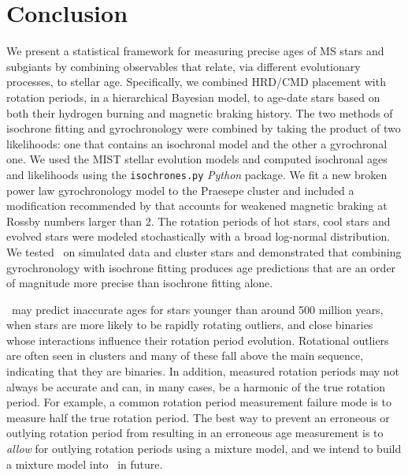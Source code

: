 \section{Conclusion}
\label{section:conclusion}

We present a statistical framework for measuring precise ages of MS stars and
subgiants by combining observables that relate, via different evolutionary
processes, to stellar age.
Specifically, we combined HRD/CMD placement with rotation periods, in a
hierarchical Bayesian model, to age-date stars based on both their hydrogen
burning and magnetic braking history.
The two methods of isochrone fitting and gyrochronology were combined by
taking the product of two likelihoods: one that contains an isochronal model
and the other a gyrochronal one.
We used the MIST stellar evolution models and computed isochronal ages and
likelihoods using the {\tt isochrones.py} {\it Python} package.
We fit a new broken power law gyrochronology model to the Praesepe cluster
and included a modification recommended by \citet{vansaders2016} that accounts
for weakened magnetic braking at Rossby numbers larger than 2.
The rotation periods of hot stars, cool stars and evolved stars were modeled
stochastically with a broad log-normal distribution.
We tested \sd\ on simulated data and cluster stars and demonstrated that
combining gyrochronology with isochrone fitting produces age predictions that
are an order of magnitude more precise than isochrone fitting alone.

\sd\ may predict inaccurate ages for stars younger than around 500 million
years, when stars are more likely to be rapidly rotating outliers, and close
binaries whose interactions influence their rotation period evolution.
Rotational outliers are often seen in clusters \citep[see \eg][]{douglas2016,
rebull2016, douglas2017, rebull2017} and many of these fall above the main
sequence, indicating that they are binaries.
In addition, measured rotation periods may not always be accurate and can, in
many cases, be a harmonic of the true rotation period.
For example, a common rotation period measurement failure mode is to measure
half the true rotation period.
The best way to prevent an erroneous or outlying rotation period from
resulting in an erroneous age measurement is to {\it allow} for outlying
rotation periods using a mixture model, and we intend to build a mixture model
into \sd\ in future.

